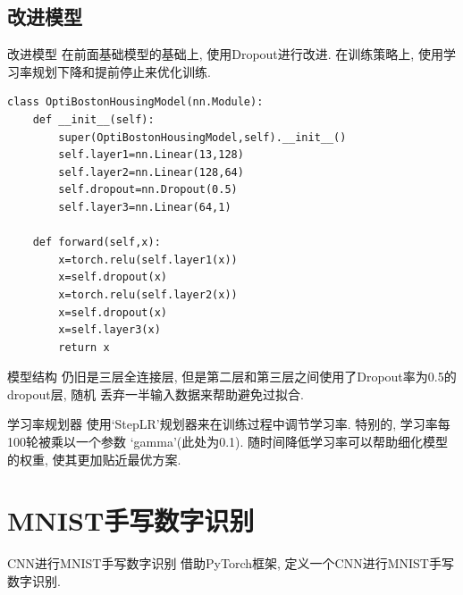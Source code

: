 \documentclass{beamer}
\begin{document}
\subsection{改进模型}

\begin{frame}[fragile]{改进模型}
	在前面基础模型的基础上, 使用Dropout进行改进. 在训练策略上, 使用学习率规划下降和提前停止来优化训练.
	\begin{verbatim}
class OptiBostonHousingModel(nn.Module):
    def __init__(self):
        super(OptiBostonHousingModel,self).__init__()
        self.layer1=nn.Linear(13,128)
        self.layer2=nn.Linear(128,64)
        self.dropout=nn.Dropout(0.5)
        self.layer3=nn.Linear(64,1)
        
    def forward(self,x):
        x=torch.relu(self.layer1(x))
        x=self.dropout(x)
        x=torch.relu(self.layer2(x))
        x=self.dropout(x)
        x=self.layer3(x)
        return x
	\end{verbatim}
\end{frame}

\begin{frame}[fragile]{模型结构}
	仍旧是三层全连接层, 但是第二层和第三层之间使用了Dropout率为0.5的dropout层, 随机
	丢弃一半输入数据来帮助避免过拟合.

	\begin{block}{学习率规划器}
		使用`StepLR'规划器来在训练过程中调节学习率. 特别的, 学习率每100轮被乘以一个参数
		`gamma'(此处为0.1). 随时间降低学习率可以帮助细化模型的权重, 使其更加贴近最优方案.
	\end{block}
\end{frame}

\section{MNIST手写数字识别}
\begin{frame}[fragile]{CNN进行MNIST手写数字识别}
	借助PyTorch框架, 定义一个CNN进行MNIST手写数字识别.
\end{frame}
\end{document}
